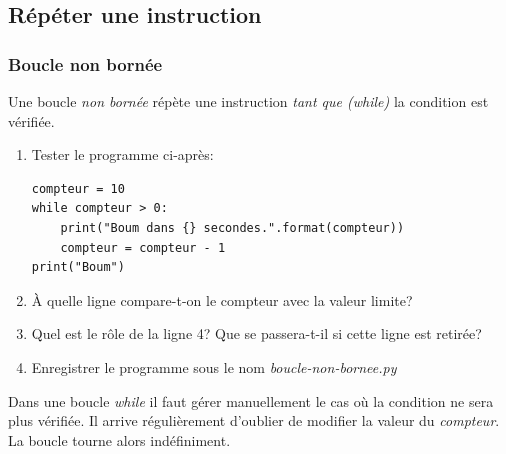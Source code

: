 \documentclass[a4paper,11pt]{article}
\begin{document}
\begin{Form}
\subsection{Répéter une instruction}
\subsubsection{Boucle non bornée}
Une boucle \emph{non bornée} répète une instruction \emph{tant que (while)} la condition est vérifiée.
\begin{activite}
\begin{enumerate}
\item Tester le programme ci-après:
\begin{lstlisting}
compteur = 10
while compteur > 0:
    print("Boum dans {} secondes.".format(compteur))
    compteur = compteur - 1
print("Boum")
\end{lstlisting}
\item À quelle ligne compare-t-on le compteur avec la valeur limite?
\item Quel est le rôle de la ligne 4? Que se passera-t-il si cette ligne est retirée?
\item Enregistrer le programme sous le nom \emph{boucle-non-bornee.py}
\end{enumerate}
\end{activite}
\begin{aretenir}
Dans une boucle \emph{while} il faut gérer manuellement le cas où la condition ne sera plus vérifiée. Il arrive régulièrement d'oublier de modifier la valeur du \emph{compteur}. La boucle tourne alors indéfiniment.
\end{aretenir}

\end{Form}
\end{document}
